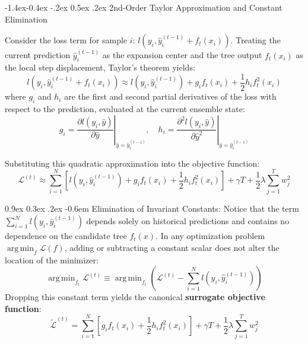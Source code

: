 \documentclass[11pt,a4paper]{article}
\makeatletter
\renewcommand\subsection{\@startsection{subsection}{2}{\z@}%
                                     {-1.4ex\@plus -0.4ex \@minus -.2ex}%
                                     {0.5ex \@plus .2ex}%
                                     {\normalfont\normalsize\bfseries}}
\renewcommand\paragraph{\@startsection{paragraph}{4}{\z@}%
                                     {0.9ex \@plus0.3ex \@minus.2ex}%
                                     {-0.6em}%
                                     {\normalfont\normalsize\bfseries}}
\DeclareMathOperator*{\argmin}{arg\,min}
\makeatother
\begin{document}
\subsection{2nd-Order Taylor Approximation and Constant Elimination}

Consider the loss term for sample $i$: $l(y_i, \hat{y}_i^{(t-1)} + f_t(x_i))$. Treating the current prediction $\hat{y}_i^{(t-1)}$ as the expansion center and the tree output $f_t(x_i)$ as the local step displacement, Taylor's theorem yields:
\begin{equation}
    l\left(y_i, \hat{y}_i^{(t-1)} + f_t(x_i)\right) \approx l\left(y_i, \hat{y}_i^{(t-1)}\right) + g_i f_t(x_i) + \frac{1}{2} h_i f_t^2(x_i)
\end{equation}
where $g_i$ and $h_i$ are the first and second partial derivatives of the loss with respect to the prediction, evaluated at the current ensemble state:
\begin{equation}
    g_i = \left. \frac{\partial l(y_i, \hat{y})}{\partial \hat{y}} \right|_{\hat{y} = \hat{y}_i^{(t-1)}}, \quad h_i = \left. \frac{\partial^2 l(y_i, \hat{y})}{\partial \hat{y}^2} \right|_{\hat{y} = \hat{y}_i^{(t-1)}}
\end{equation}

Substituting this quadratic approximation into the objective function:
\begin{equation}
    \mathcal{L}^{(t)} \approx \sum_{i=1}^N \left[ l\left(y_i, \hat{y}_i^{(t-1)}\right) + g_i f_t(x_i) + \frac{1}{2} h_i f_t^2(x_i) \right] + \gamma T + \frac{1}{2}\lambda \sum_{j=1}^T w_j^2
\end{equation}

\paragraph{Elimination of Invariant Constants:}
Notice that the term $\sum_{i=1}^N l(y_i, \hat{y}_i^{(t-1)})$ depends solely on historical predictions and contains no dependence on the candidate tree $f_t(x)$. In any optimization problem $\argmin_f \mathcal{L}(f)$, adding or subtracting a constant scalar does not alter the location of the minimizer:
\begin{equation}
    \argmin_{f_t} \mathcal{L}^{(t)} \equiv \argmin_{f_t} \left( \mathcal{L}^{(t)} - \sum_{i=1}^N l\left(y_i, \hat{y}_i^{(t-1)}\right) \right)
\end{equation}
Dropping this constant term yields the canonical \textbf{surrogate objective function}:
\begin{equation}
    \tilde{\mathcal{L}}^{(t)} = \sum_{i=1}^N \left[ g_i f_t(x_i) + \frac{1}{2} h_i f_t^2(x_i) \right] + \gamma T + \frac{1}{2}\lambda \sum_{j=1}^T w_j^2
\end{equation}
\end{document}
